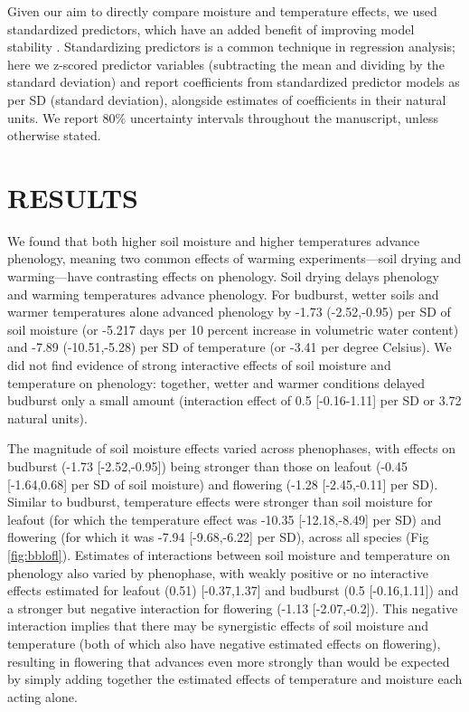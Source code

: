 \documentclass{article}
\begin{document}
\par Given our aim to directly compare moisture and temperature effects, we used standardized predictors, which have an added benefit of improving model stability \citep{gelman2007}. Standardizing predictors is a common technique in regression analysis; here we z-scored predictor variables (subtracting the mean and dividing by the standard deviation) and report coefficients from standardized predictor models as per SD (standard deviation), alongside estimates of coefficients in their natural units. We report 80\% uncertainty intervals throughout the manuscript, unless otherwise stated.

\section* {RESULTS}

\par We found that both higher soil moisture and higher temperatures advance phenology, meaning two common effects of warming experiments---soil drying and warming---have contrasting effects on phenology. Soil drying delays phenology and warming temperatures advance phenology. For budburst, wetter soils and warmer temperatures alone advanced phenology by -1.73 (-2.52,-0.95) per SD of soil moisture  (or -5.217 days per 10 percent increase in volumetric water content) and -7.89 (-10.51,-5.28) per SD of temperature (or -3.41 per degree Celsius). We did not find evidence of strong interactive effects of soil moisture and temperature on phenology: together, wetter and warmer conditions delayed budburst only a small amount (interaction effect of 0.5 [-0.16-1.11] per SD or 3.72 natural units). 

\par The magnitude of soil moisture effects varied across phenophases, with effects on budburst (-1.73 [-2.52,-0.95]) being stronger than those on leafout (-0.45 [-1.64,0.68] per SD of soil moisture) and flowering (-1.28 [-2.45,-0.11] per SD). Similar to budburst, temperature effects were stronger than soil moisture for leafout (for which the temperature effect was -10.35 [-12.18,-8.49] per SD) and flowering (for which it was -7.94 [-9.68,-6.22] per SD), across all species (Fig \ref{fig:bblofl}). Estimates of interactions between soil moisture and temperature on phenology also varied by phenophase, with weakly positive or no interactive effects estimated for leafout (0.51) [-0.37,1.37] and budburst (0.5 [-0.16,1.11]) and a stronger but negative interaction for flowering (-1.13 [-2.07,-0.2]). This negative interaction implies that there may be synergistic effects of soil moisture and temperature (both of which also have negative estimated effects on flowering), resulting in flowering that advances even more strongly than would be expected by simply adding together the  estimated effects of temperature and  moisture each acting alone. 
\end{document}
